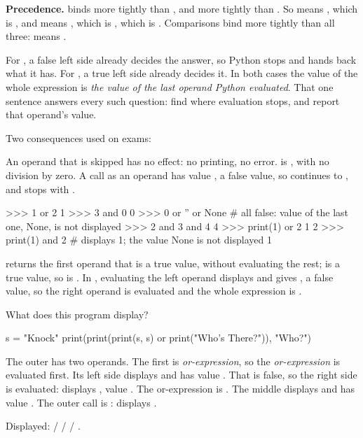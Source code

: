 \documentclass[10pt]{scrartcl}
\begin{document}
\textbf{Precedence.}  binds more tightly than , and  more tightly than . So  means , which is , and  means , which is , which is . Comparisons bind more tightly than all three:  means .
\begin{ideabox}
For , a false left side already decides the answer, so Python stops and hands back what it has. For , a true left side already decides it. In both cases the value of the whole expression is \emph{the value of the last operand Python evaluated}. That one sentence answers every such question: find where evaluation stops, and report that operand's value.

Two consequences used on exams:
\begin{enumerate}[(1)]
  \ii An operand that is skipped has no effect: no printing, no error.  is , with no division by zero.
  \ii A  call as an operand has value , a false value, so  continues to , and  stops with .
\end{enumerate}
\end{ideabox}
\begin{py}
>>> 1 or 2
1
>>> 3 and 0
0
>>> 0 or '' or None      # all false: value of the last one, None, is not displayed
>>> 2 and 3 and 4
4
>>> print(1) or 2
1
2
>>> print(1) and 2       # displays 1; the value None is not displayed
1
\end{py}
\revisit {} returns the first operand that is a true value, without evaluating the rest;  is a true value, so  is . In , evaluating the left operand displays  and gives , a false value, so the right operand is evaluated and the whole expression is .

\begin{example*}
What does this program display?
\begin{py}
s = "Knock"
print(print(print(s, s) or print("Who's There?")), "Who?")
\end{py}
\begin{steps}
  \ii The outer  has two operands. The first is \emph{or-expression}\cd{)}, so the \emph{or-expression} is evaluated first.
  \ii Its left side  displays  and has value . That is false, so the right side is evaluated: displays , value . The or-expression is .
  \ii The middle  displays  and has value .
  \ii The outer call is : displays .
\end{steps}
Displayed:  /  /  / .
\end{example*}
\end{document}
